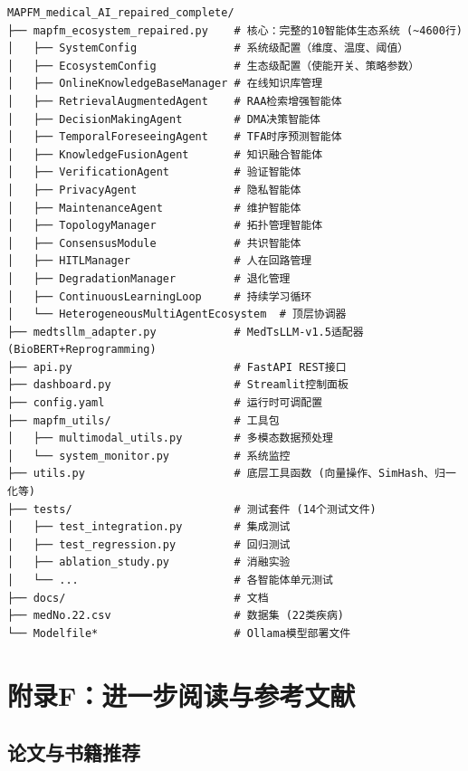 \documentclass[11pt,a4paper]{ctexart}
\begin{document}
\small
\begin{verbatim}
MAPFM_medical_AI_repaired_complete/
├── mapfm_ecosystem_repaired.py    # 核心：完整的10智能体生态系统 (~4600行)
│   ├── SystemConfig               # 系统级配置（维度、温度、阈值）
│   ├── EcosystemConfig            # 生态级配置（使能开关、策略参数）
│   ├── OnlineKnowledgeBaseManager # 在线知识库管理
│   ├── RetrievalAugmentedAgent    # RAA检索增强智能体
│   ├── DecisionMakingAgent        # DMA决策智能体
│   ├── TemporalForeseeingAgent    # TFA时序预测智能体
│   ├── KnowledgeFusionAgent       # 知识融合智能体
│   ├── VerificationAgent          # 验证智能体
│   ├── PrivacyAgent               # 隐私智能体
│   ├── MaintenanceAgent           # 维护智能体
│   ├── TopologyManager            # 拓扑管理智能体
│   ├── ConsensusModule            # 共识智能体
│   ├── HITLManager                # 人在回路管理
│   ├── DegradationManager         # 退化管理
│   ├── ContinuousLearningLoop     # 持续学习循环
│   └── HeterogeneousMultiAgentEcosystem  # 顶层协调器
├── medtsllm_adapter.py            # MedTsLLM-v1.5适配器 (BioBERT+Reprogramming)
├── api.py                         # FastAPI REST接口
├── dashboard.py                   # Streamlit控制面板
├── config.yaml                    # 运行时可调配置
├── mapfm_utils/                   # 工具包
│   ├── multimodal_utils.py        # 多模态数据预处理
│   └── system_monitor.py          # 系统监控
├── utils.py                       # 底层工具函数 (向量操作、SimHash、归一化等)
├── tests/                         # 测试套件 (14个测试文件)
│   ├── test_integration.py        # 集成测试
│   ├── test_regression.py         # 回归测试
│   ├── ablation_study.py          # 消融实验
│   └── ...                        # 各智能体单元测试
├── docs/                          # 文档
├── medNo.22.csv                   # 数据集 (22类疾病)
└── Modelfile*                     # Ollama模型部署文件
\end{verbatim}
\normalsize

\newpage


\newpage

\section*{附录F：进一步阅读与参考文献}

\subsection*{论文与书籍推荐}
\end{document}
